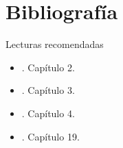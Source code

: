 \documentclass[9pt, aspectratio=169]{beamer}
\begin{document}
\section*{Bibliografía}
\begin{frame}[allowframebreaks]{Lecturas recomendadas}
\begin{itemize}
    \item {}. Capítulo 2.
    \item {}. Capítulo 3.
    \item {}. Capítulo 4.
 \item {}. Capítulo 19.
\end{itemize}
\end{frame}
\end{document}
